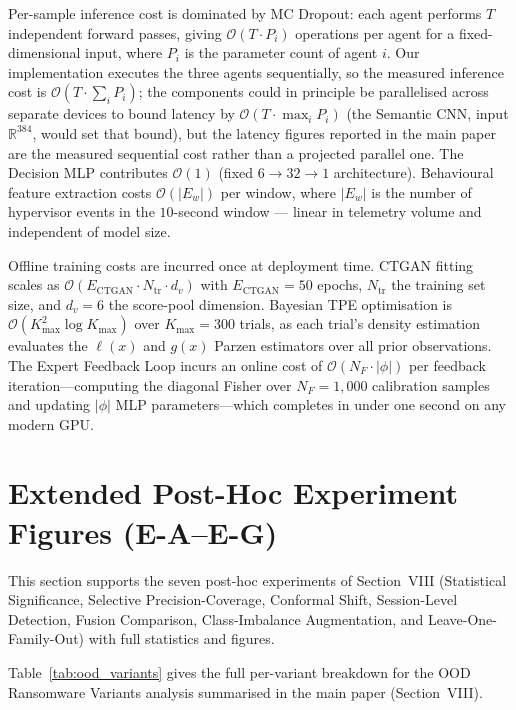 \documentclass[journal]{IEEEtran}
\begin{document}
Per-sample inference cost is dominated by MC Dropout: each agent performs $T$
independent forward passes, giving $\mathcal{O}(T \cdot P_i)$ operations per
agent for a fixed-dimensional input, where $P_i$ is the parameter count of
agent $i$.
Our implementation executes the three agents sequentially, so the measured
inference cost is $\mathcal{O}(T \cdot \sum_i P_i)$; the components could in
principle be parallelised across separate devices to bound latency by
$\mathcal{O}(T \cdot \max_i P_i)$ (the Semantic CNN, input
$\mathbb{R}^{384}$, would set that bound), but the latency figures reported
in the main paper are the measured sequential cost rather than a projected
parallel one.
The Decision MLP contributes $\mathcal{O}(1)$ (fixed $6{\to}32{\to}1$
architecture).
Behavioural feature extraction costs $\mathcal{O}(|E_w|)$ per window, where
$|E_w|$ is the number of hypervisor events in the $10$-second window ---
linear in telemetry volume and independent of model size.

Offline training costs are incurred once at deployment time.
CTGAN fitting scales as $\mathcal{O}(E_{\text{CTGAN}} \cdot N_{\text{tr}}
\cdot d_v)$ with $E_{\text{CTGAN}}{=}50$ epochs, $N_{\text{tr}}$ the
training set size, and $d_v{=}6$ the score-pool dimension.
Bayesian TPE optimisation is $\mathcal{O}(K_{\max}^{2} \log K_{\max})$
over $K_{\max}{=}300$ trials, as each trial's density estimation evaluates
the $\ell(x)$ and $g(x)$ Parzen estimators over all prior observations.
The Expert Feedback Loop incurs an online cost of
$\mathcal{O}(N_F \cdot |\phi|)$ per feedback iteration---computing the
diagonal Fisher over $N_F{=}1{,}000$ calibration samples and updating
$|\phi|$ MLP parameters---which completes in under one second on any
modern GPU.

\section{Extended Post-Hoc Experiment Figures (E-A--E-G)}\label{sec:supp_eaeg}

This section supports the seven post-hoc experiments of Section~VIII
(Statistical Significance, Selective Precision-Coverage, Conformal Shift,
Session-Level Detection, Fusion Comparison, Class-Imbalance Augmentation, and
Leave-One-Family-Out) with full statistics and figures.

Table~\ref{tab:ood_variants} gives the full
per-variant breakdown for the OOD Ransomware Variants analysis summarised in
the main paper (Section~VIII).
\end{document}
